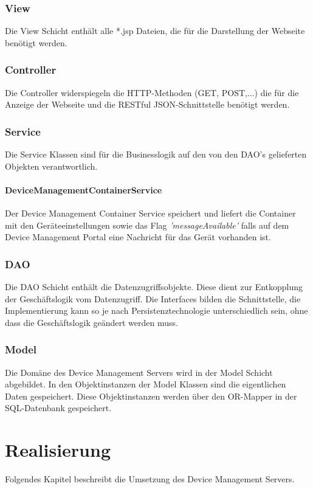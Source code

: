 \subsubsection{View}
Die View Schicht enthält alle *.jsp Dateien, die für die Darstellung der Webseite benötigt werden. 

\subsubsection{Controller}
Die Controller widerspiegeln die HTTP-Methoden (GET, POST,...) die für die Anzeige der Webseite und die RESTful JSON-Schnittstelle benötigt werden.

\subsubsection{Service}
Die Service Klassen sind für die Businesslogik auf den von den DAO's gelieferten Objekten verantwortlich.

\paragraph{DeviceManagementContainerService}
Der Device Management Container Service speichert und liefert die Container mit den Geräteeinstellungen sowie das Flag \textit{'messageAvailable'} falls auf dem Device Management Portal eine Nachricht für das Gerät vorhanden ist.

\subsubsection{DAO}
Die DAO Schicht enthält die Datenzugriffsobjekte. Diese dient zur Entkopplung der Geschäftslogik vom Datenzugriff. Die Interfaces bilden die Schnittstelle, die Implementierung kann so je nach Persistenztechnologie unterschiedlich sein, ohne dass die Geschäftslogik geändert werden muss.


\subsubsection{Model}
Die Domäne des Device Management Servers wird in der Model Schicht abgebildet. In den Objektinstanzen der Model Klassen sind die eigentlichen Daten gespeichert. Diese Objektinstanzen werden über den OR-Mapper in der SQL-Datenbank gespeichert.



\section{Realisierung}
Folgendes Kapitel beschreibt die Umsetzung des Device Management Servers.

